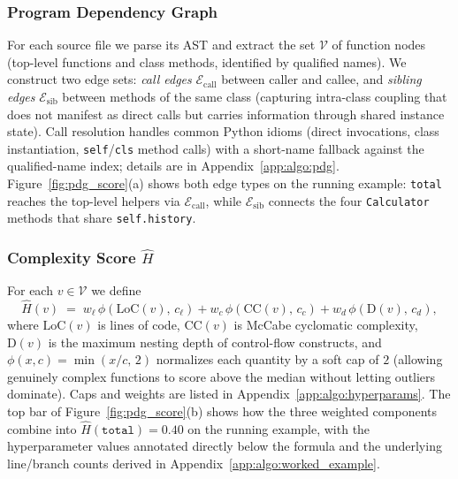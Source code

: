 \subsubsection{Program Dependency Graph}
\label{sec:method:pdg}

For each source file we parse its AST and extract the set $\mathcal{V}$
of function nodes (top-level functions and class methods, identified by
qualified names). We construct two edge sets: \emph{call edges}
$\mathcal{E}_{\mathrm{call}}$ between caller and callee, and
\emph{sibling edges} $\mathcal{E}_{\mathrm{sib}}$ between methods of the
same class (capturing intra-class coupling that does not manifest as
direct calls but carries information through shared instance state).
Call resolution handles common Python idioms (direct invocations, class
instantiation, \texttt{self}/\texttt{cls} method calls) with a
short-name fallback against the qualified-name index; details are in
Appendix~\ref{app:algo:pdg}.
Figure~\ref{fig:pdg_score}(a) shows both edge types on the running
example: \texttt{total} reaches the top-level helpers via
$\mathcal{E}_{\mathrm{call}}$, while $\mathcal{E}_{\mathrm{sib}}$
connects the four \texttt{Calculator} methods that share
\texttt{self.history}.

\subsubsection{Complexity Score $\hat{H}$}
\label{sec:method:complexity}

For each $v \in \mathcal{V}$ we define
%
\begin{equation}
  \hat{H}(v) \;=\; w_{\ell}\,\phi\!\left(\mathrm{LoC}(v),\,c_{\ell}\right)
            + w_{c}\,\phi\!\left(\mathrm{CC}(v),\,c_{c}\right)
            + w_{d}\,\phi\!\left(\mathrm{D}(v),\,c_{d}\right),
  \label{eq:complexity}
\end{equation}
%
where $\mathrm{LoC}(v)$ is lines of code, $\mathrm{CC}(v)$ is McCabe
cyclomatic complexity, $\mathrm{D}(v)$ is the maximum nesting depth of
control-flow constructs, and $\phi(x, c) = \min(x / c,\, 2)$ normalizes
each quantity by a soft cap of $2$ (allowing genuinely complex functions
to score above the median without letting outliers dominate). Caps and
weights are listed in Appendix~\ref{app:algo:hyperparams}. The top bar
of Figure~\ref{fig:pdg_score}(b) shows how the three weighted
components combine into $\hat{H}(\texttt{total})\!=\!0.40$ on the
running example, with the hyperparameter values annotated directly
below the formula and the underlying line/branch counts derived in
Appendix~\ref{app:algo:worked_example}.

